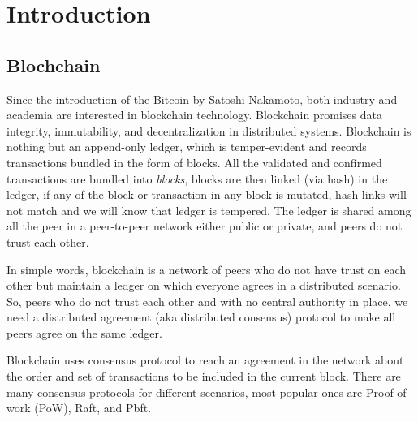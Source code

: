 \chapter{Introduction}
\label{ch:int}


\section{Blochchain}
Since the introduction of the Bitcoin by Satoshi Nakamoto\cite{nakamoto2008bitcoin}, both industry and academia are interested in blockchain technology.  Blockchain  \cite{zikratov2017ensuring} promises data integrity, immutability, and decentralization in distributed systems. Blockchain is nothing but an append-only ledger, which is temper-evident and records transactions bundled in the form of blocks\cite{ibm_developer}. All the validated and confirmed transactions are bundled into \textit{blocks}, blocks are then linked (via hash) in the ledger, if any of the block or transaction in any block is mutated, hash links will not match and we will know that ledger is tempered. The ledger is shared among all the peer in a peer-to-peer network either public or private, and peers do not trust each other. \cite{intro_hyperledger}\cite{haber1997secure}\cite{merkle1980protocols}\cite{massias1999design}

In simple words, blockchain is a network of peers who do not have trust on each other
but maintain a ledger on which everyone agrees in a distributed scenario. So, peers
who do not trust each other and with no central authority in place, we need a distributed agreement 
(aka distributed consensus) protocol to make all peers agree on the same ledger.


 Blockchain uses consensus protocol\cite{cachin2017blockchain} to reach an agreement in the network about the order and set of transactions to be included in the current block. There are many consensus protocols for different scenarios, most popular ones are Proof-of-work (PoW), Raft\cite{10.5555/2643634.2643666}, and Pbft\cite{castro1999practical}.
